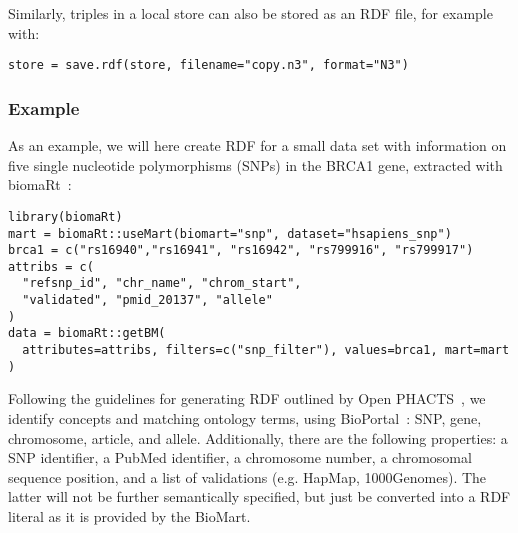 \documentclass[12pt]{article}
\begin{document}
Similarly, triples in a local store can also be stored as an RDF file, for example with:

\begin{footnotesize}
\begin{verbatim}
store = save.rdf(store, filename="copy.n3", format="N3")
\end{verbatim}
\end{footnotesize}

\subsubsection{Example}

As an example, we will here create RDF for a small data set with information on five single nucleotide
polymorphisms (SNPs) in the BRCA1 gene, extracted with biomaRt~\cite{Durinck2005}:

\begin{footnotesize}
\begin{verbatim}
library(biomaRt)
mart = biomaRt::useMart(biomart="snp", dataset="hsapiens_snp")
brca1 = c("rs16940","rs16941", "rs16942", "rs799916", "rs799917")
attribs = c(
  "refsnp_id", "chr_name", "chrom_start",
  "validated", "pmid_20137", "allele"
)
data = biomaRt::getBM(
  attributes=attribs, filters=c("snp_filter"), values=brca1, mart=mart
)
\end{verbatim}
\end{footnotesize}

Following the guidelines for generating RDF outlined by Open PHACTS~\cite{Haupt2013,Williams2012}, we identify concepts
and matching ontology terms, using BioPortal~\cite{Noy2009}: SNP, gene, chromosome,
article, and allele. Additionally, there are the following properties: a SNP identifier, a PubMed identifier,
a chromosome number, a chromosomal sequence position, and a list of validations (e.g. HapMap, 1000Genomes).
The latter will not be further semantically specified, but just be converted into a RDF literal as it is
provided by the BioMart.
\end{document}
